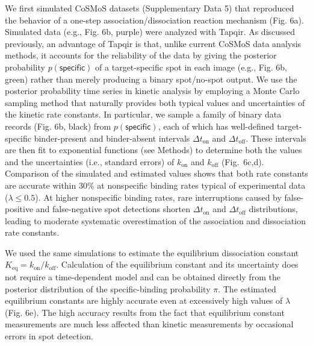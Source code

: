 We first simulated CoSMoS datasets (Supplementary Data 5) that reproduced the behavior of a one-step association/dissociation reaction mechanism (Fig. 6a). Simulated data (e.g., Fig. 6b, purple) were analyzed with Tapqir.   As discussed previously, an advantage of Tapqir is that, unlike current CoSMoS data analysis methods, it accounts for the reliability of the data by giving the posterior probability $p(\mathsf{specific})$ of a target-specific spot in each image (e.g., Fig. 6b, green) rather than merely producing a binary spot/no-spot output.  We use the posterior probability time series in kinetic analysis by employing a Monte Carlo sampling method that naturally provides both typical values and uncertainties of the kinetic rate constants.  In particular, we sample a family of binary data records (Fig. 6b, black) from $p(\mathsf{specific})$, each of which has well-defined target-specific binder-present and binder-absent intervals $\Delta t_\mathrm{on}$ and $\Delta t_\mathrm{off}$. These intervals are then fit to exponential functions (see Methods) to determine both the values and the uncertainties (i.e., standard errors) of $k_\mathrm{on}$ and $k_\mathrm{off}$ (Fig.~6c,d). Comparison of the simulated and estimated values shows that both rate constants are accurate within 30\% at nonspecific binding rates typical of experimental data ($\lambda \leq 0.5$). At higher nonspecific binding rates, rare interruptions caused by false-positive and false-negative spot detections shorten $\Delta t_\mathrm{on}$ and $\Delta t_\mathrm{off}$ distributions, leading to moderate systematic overestimation of the association and dissociation rate constants.

We used the same simulations to estimate the equilibrium dissociation constant $K_\mathrm{eq} = k_\mathrm{on}/k_\mathrm{off}$.  Calculation of the equilibrium constant and its uncertainty does not require a time-dependent model and can be obtained directly from the posterior distribution of the specific-binding probability $\pi$. The estimated equilibrium constants are highly accurate even at excessively  high values of $\lambda$ (Fig. 6e).  The high accuracy results from the fact that equilibrium constant measurements are much less affected than kinetic measurements by occasional errors in spot detection. 

